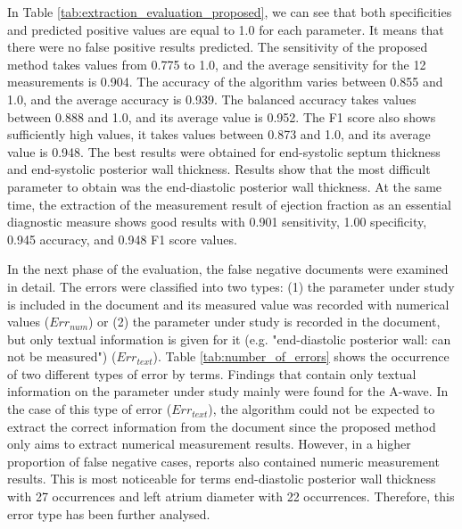 In Table \ref{tab:extraction_evaluation_proposed}, we can see that both specificities and predicted positive values are equal to 1.0 for each parameter. It means that there were no false positive results predicted. The sensitivity of the proposed method takes values from 0.775 to 1.0, and the average sensitivity for the 12 measurements is 0.904. The accuracy of the algorithm varies between 0.855 and 1.0, and the average accuracy is 0.939. The balanced accuracy takes values between 0.888 and 1.0, and its average value is 0.952. The F1 score also shows sufficiently high values, it takes values between 0.873 and 1.0, and its average value is 0.948. The best results were obtained for end-systolic septum thickness and end-systolic posterior wall thickness. Results show that the most difficult parameter to obtain was the end-diastolic posterior wall thickness. At the same time, the extraction of the measurement result of ejection fraction as an essential diagnostic measure shows good results with 0.901 sensitivity, 1.00 specificity, 0.945 accuracy, and 0.948 F1 score values.

In the next phase of the evaluation, the false negative documents were examined in detail. The errors were classified into two types: (1) the parameter under study is included in the document and its measured value was recorded with numerical values ($Err_{num}$) or (2) the parameter under study is recorded in the document, but only textual information is given for it (e.g. "end-diastolic posterior wall: can not be measured") ($Err_{text}$). Table \ref{tab:number_of_errors} shows the occurrence of two different types of error by terms. Findings that contain only textual information on the parameter under study mainly were found for the A-wave. In the case of this type of error ($Err_{text}$), the algorithm could not be expected to extract the correct information from the document since the proposed method only aims to extract numerical measurement results. However, in a higher proportion of false negative cases, reports also contained numeric measurement results. This is most noticeable for terms end-diastolic posterior wall thickness with 27 occurrences and left atrium diameter with 22 occurrences. Therefore, this error type has been further analysed.

